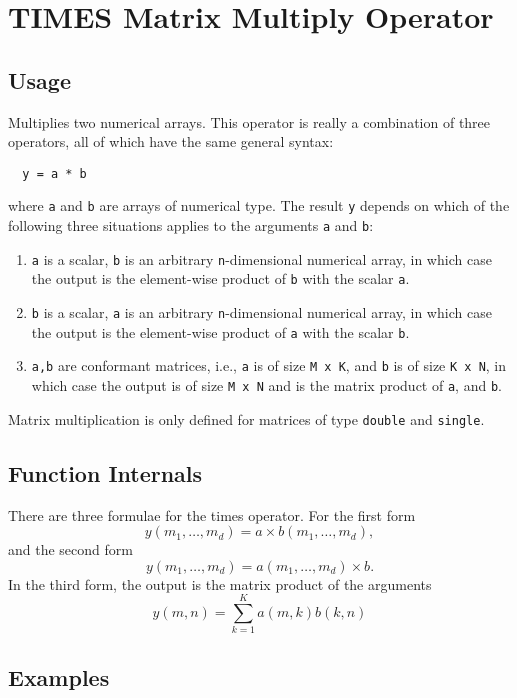 \section{TIMES Matrix Multiply Operator}

\subsection{Usage}

Multiplies two numerical arrays.  This operator is really a combination
of three operators, all of which have the same general syntax:
\begin{verbatim}
  y = a * b
\end{verbatim}
where \verb|a| and \verb|b| are arrays of numerical type.  The result \verb|y| depends
on which of the following three situations applies to the arguments
\verb|a| and \verb|b|:
\begin{enumerate}
\item  \verb|a| is a scalar, \verb|b| is an arbitrary \verb|n|-dimensional numerical array, in which case the output is the element-wise product of \verb|b| with the scalar \verb|a|.

\item  \verb|b| is a scalar, \verb|a| is an arbitrary \verb|n|-dimensional numerical array, in which case the output is the element-wise product of \verb|a| with the scalar \verb|b|.

\item  \verb|a,b| are conformant matrices, i.e., \verb|a| is of size \verb|M x K|, and \verb|b| is of size \verb|K x N|, in which case the output is of size \verb|M x N| and is the matrix product of \verb|a|, and \verb|b|.

\end{enumerate}
Matrix multiplication is only defined for matrices of type \verb|double| 
and \verb|single|.
\subsection{Function Internals}

There are three formulae for the times operator.  For the first form
\[
y(m_1,\ldots,m_d) = a \times b(m_1,\ldots,m_d),
\]
and the second form
\[
y(m_1,\ldots,m_d) = a(m_1,\ldots,m_d) \times b.
\]
In the third form, the output is the matrix product of the arguments
\[
y(m,n) = \sum_{k=1}^{K} a(m,k) b(k,n)
\]
\subsection{Examples}

